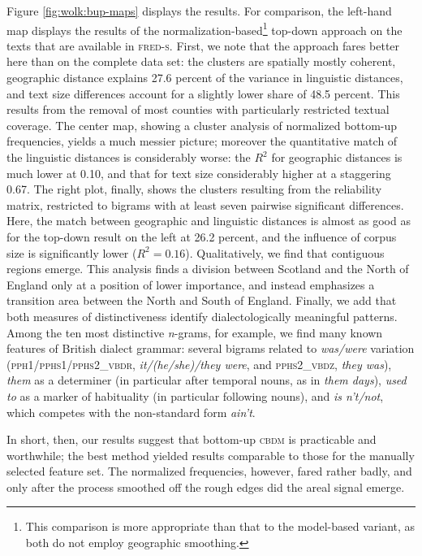 \documentclass[output=paper]{LSP/langsci}
\begin{document}
Figure \ref{fig:wolk:bup-maps} displays the results.
For comparison, the left-hand map displays the results of the normalization-based\footnote{This comparison is more appropriate than that to the model-based variant, as both do not employ geographic smoothing.} top-down approach on the texts that are available in \textsc{fred-s}.
First, we note that the approach fares better here than on the complete data set: the clusters are spatially mostly coherent, geographic distance explains 27.6 percent of the variance in linguistic distances, and text size differences account for a slightly lower share of 48.5 percent. 
This results from the removal of most counties with particularly restricted textual coverage.
The center map, showing a cluster analysis of normalized bottom-up frequencies, yields a much messier picture; moreover the quantitative match of the linguistic distances is considerably worse: the $R^2$ for geographic distances is much lower at 0.10, and that for text size considerably higher at a staggering 0.67.
The right plot, finally, shows the clusters resulting from the reliability matrix, restricted to bigrams with at least seven pairwise significant differences.
Here, the match between geographic and linguistic distances is almost as good as for the top-down result on the left at 26.2 percent, and the influence of corpus size is significantly lower ($R^2 = 0.16$).
Qualitatively, we find that contiguous regions emerge. 
This analysis finds a division between Scotland and the North of England only at a position of lower importance, and instead emphasizes a transition area between the North and South of England.
Finally, we add that both measures of distinctiveness identify dialectologically meaningful patterns.
Among the ten most distinctive \emph{n}-grams, for example, we find many known features of British dialect grammar: several bigrams related to \emph{was/were} variation (\textsc{pph1/pphs1/pphs2\_vbdr}, \emph{it/(he/she)/they were}, and \textsc{pphs2\_vbdz}, \emph{they was}), \emph{them} as a determiner (in particular after temporal nouns, as in \emph{them days}), \emph{used to} as a marker of habituality (in particular following nouns), and \emph{is n't/not}, which competes with the non-standard form \emph{ain't}.

In short, then, our results suggest that bottom-up \textsc{cbdm} is practicable and worthwhile; the best method yielded results comparable to those for the manually selected feature set. 
The normalized frequencies, however, fared rather badly, and only after the  process smoothed off the rough edges did the areal signal emerge.
\end{document}

